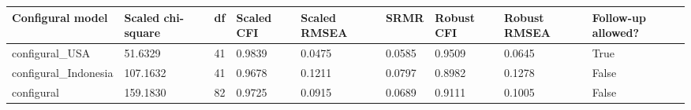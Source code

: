 \begin{tabular}{lllllllll}
\toprule
Configural model & Scaled chi-square & df & Scaled CFI & Scaled RMSEA & SRMR & Robust CFI & Robust RMSEA & Follow-up allowed? \\
\midrule
configural\_USA & 51.6329 & 41 & 0.9839 & 0.0475 & 0.0585 & 0.9509 & 0.0645 & True \\
configural\_Indonesia & 107.1632 & 41 & 0.9678 & 0.1211 & 0.0797 & 0.8982 & 0.1278 & False \\
configural & 159.1830 & 82 & 0.9725 & 0.0915 & 0.0689 & 0.9111 & 0.1005 & False \\
\bottomrule
\end{tabular}
